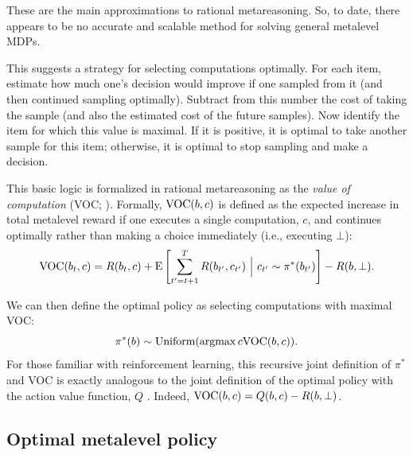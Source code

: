 These are the main approximations to rational metareasoning. So, to date, there appears to be no accurate and scalable method for solving general metalevel MDPs.


This suggests a strategy for selecting computations optimally. For each item, estimate how much one's decision would improve if one sampled from it (and then continued sampling optimally). Subtract from this number the cost of taking the sample (and also the estimated cost of the future samples). Now identify the item for which this value is maximal. If it is positive, it is optimal to take another sample for this item; otherwise, it is optimal to stop sampling and make a decision.

This basic logic is formalized in rational metareasoning as the \textit{value of computation} (VOC; \citealp{russell1991principles}). Formally, $\text{VOC}(b, c)$ is defined as the expected increase in total metalevel reward if one executes a single computation, $c$, and continues optimally rather than making a choice immediately (i.e., executing $\bot$):
$$
\text{VOC}(b_t, c) = R(b_t, c) + \operatorname*{E} \left[
  \sum_{t'=t+1}^T R(b_{t'}, c_{t'})\ \Big\vert\ c_{t'} \sim \pi^*(b_{t'}) 
\right] - R(b, \bot).
$$

We can then define the optimal policy as selecting computations with maximal VOC:
$$
\pi^*(b) \sim \text{Uniform}(\operatorname*{argmax}{c} \text{VOC}(b, c)).
$$
For those familiar with reinforcement learning, this recursive joint definition of $\pi^*$ and VOC is exactly analogous to the joint definition of the optimal policy with the action value function, $Q$ \citep{sutton2018reinforcement}. Indeed, $\text{VOC}(b, c) = Q(b, c) - R(b, \bot)$. 

\subsection{Optimal metalevel policy}


